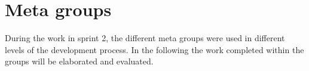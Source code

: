 \section{Meta groups}
During the work in sprint 2, the different meta groups were used in different levels of the development process. 
In the following the work completed within the groups will be elaborated and evaluated.





